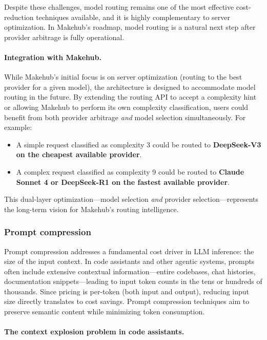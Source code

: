 \documentclass[english]{article}
\begin{document}
Despite these challenges, model routing remains one of the most effective cost-reduction techniques available, and it is highly complementary to server optimization. In Makehub's roadmap, model routing is a natural next step after provider arbitrage is fully operational.

\paragraph{Integration with Makehub.}

While Makehub's initial focus is on server optimization (routing to the best provider for a given model), the architecture is designed to accommodate model routing in the future. By extending the routing API to accept a complexity hint or allowing Makehub to perform its own complexity classification, users could benefit from both provider arbitrage \emph{and} model selection simultaneously. For example:
\begin{itemize}
    \item A simple request classified as complexity 3 could be routed to \textbf{DeepSeek-V3 on the cheapest available provider}.
    \item A complex request classified as complexity 9 could be routed to \textbf{Claude Sonnet 4 or DeepSeek-R1 on the fastest available provider}.
\end{itemize}

This dual-layer optimization—model selection \emph{and} provider selection—represents the long-term vision for Makehub's routing intelligence.


\subsubsection{Prompt compression}

Prompt compression addresses a fundamental cost driver in LLM inference: the size of the input context. In code assistants and other agentic systems, prompts often include extensive contextual information—entire codebases, chat histories, documentation snippets—leading to input token counts in the tens or hundreds of thousands. Since pricing is per-token (both input and output), reducing input size directly translates to cost savings. Prompt compression techniques aim to preserve semantic content while minimizing token consumption.

\paragraph{The context explosion problem in code assistants.}
\end{document}
